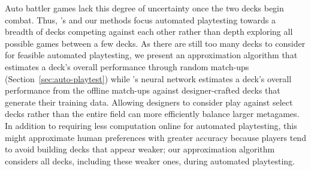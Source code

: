 Auto battler games lack this degree of uncertainty once the two decks begin combat.
Thus, \citeauthor{tencent_autobattle_lineup}'s 
and our methods focus automated playtesting towards a breadth of decks competing
against each other rather than depth exploring all possible games between a few
decks.  As there are still too many decks to consider for feasible automated
playtesting, we present an approximation algorithm that estimates a deck's overall
performance through random match-ups (Section~\ref{sec:auto-playtest}) while
\citeauthor{tencent_autobattle_lineup}'s neural network estimates a deck's overall
performance from the offline match-ups against designer-crafted decks that generate
their training data.  Allowing designers to consider play against select decks
rather than the entire field can more efficiently balance larger metagames.
In addition to requiring less computation online for automated playtesting, this
might approximate human preferences with greater accuracy because players
tend to avoid building decks that appear weaker; our approximation algorithm
considers all decks, including these weaker ones, during automated playtesting.
